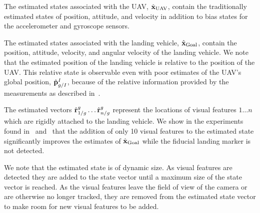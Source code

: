 The estimated states associated with the UAV, $\hat{\boldsymbol{\mathrm{x}}}_{\text{UAV}}$,
contain the traditionally estimated states of position, attitude, and velocity
in addition to bias states for the accelerometer and gyroscope sensors.

The estimated states associated with the landing vehicle,
$\hat{\boldsymbol{\mathrm{x}}}_{\text{Goal}}$, contain the position, attitude, velocity, and
angular velocity of the landing vehicle.
We note that the
estimated position of the landing vehicle is relative to the position of the
UAV. This relative state is observable even with poor estimates of the UAV's global
position, $\hat{\boldsymbol{\mathrm{p}}}_{g/I}^I$, because of the relative information provided
by the measurements as described in~.

The estimated vectors $\hat{\boldsymbol{\mathrm{r}}}_{1/g}^{g} \dots \hat{\boldsymbol{\mathrm{r}}}_{n/g}^{g}$ represent the
locations of visual features $1 \dots n$ which are rigidly attached to the
landing vehicle. We show in the experiments found in~
and~ that the
addition of only 10 visual features to the estimated state significantly
improves the estimates of $\hat{\boldsymbol{\mathrm{x}}}_{\text{Goal}}$
while the fiducial landing marker is not detected. 

We note
that the estimated state is of dynamic size. As visual features are
detected they are added to the state vector until a maximum size of the state
vector is reached. As the visual features leave the field of view of the camera
or are otherwise no longer tracked, they are removed from the estimated state
vector to make room for new visual features to be added.


